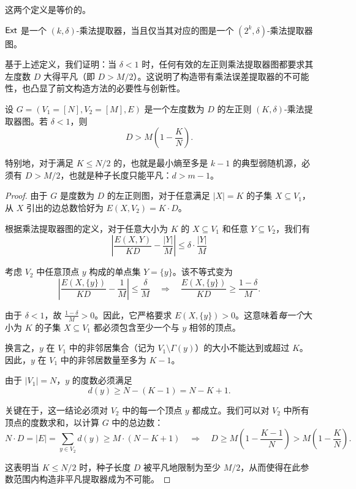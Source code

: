 这两个定义是等价的。

\begin{proposition}\label{prop:eql_ext_graph}
    $\mathsf{Ext}$ 是一个 $(k, \delta)$-乘法提取器，当且仅当其对应的图是一个 $(2^k, \delta)$-乘法提取器图。
\end{proposition}

基于上述定义，我们证明：当 $\delta < 1$ 时，任何有效的左正则乘法提取器图都要求其左度数 $D$ 大得平凡（即 $D > M / 2$）。这说明了构造带有乘法误差提取器的不可能性，也凸显了前文构造方法的必要性与创新性。

\begin{theorem}
    设 $G = (V_1 = [N], V_2 = [M], E)$ 是一个左度数为 $D$ 的左正则 $(K, \delta)$-乘法提取器图。若 $\delta < 1$，则
    $$
    D > M \left( 1 - \frac{K}{N} \right).
    $$
    
    特别地，对于满足 $K \le N/2$ 的，也就是最小熵至多是 $k - 1$ 的典型弱随机源，必须有 $D > M/2$，也就是种子长度只能平凡：$d > m - 1$。
\end{theorem}

\begin{proof}
    由于 $G$ 是度数为 $D$ 的左正则图，对于任意满足 $|X| = K$ 的子集 $X \subseteq V_1$，从 $X$ 引出的边总数恰好为 $E(X, V_2) = K \cdot D$。
    
    根据乘法提取器图的定义，对于任意大小为 $K$ 的 $X \subseteq V_1$ 和任意 $Y \subseteq V_2$，我们有
    $$
    \left| \frac{E(X,Y)}{K D} - \frac{|Y|}{M} \right| \le \delta \cdot \frac{|Y|}{M}
    $$
    
    考虑 $V_2$ 中任意顶点 $y$ 构成的单点集 $Y = \{y\}$。该不等式变为
    $$
    \left| \frac{E(X,\{y\})}{K D} - \frac{1}{M} \right| \le \frac{\delta}{M} \quad \Longrightarrow \quad \frac{E(X,\{y\})}{K D} \ge \frac{1 - \delta}{M}.
    $$
    
    由于 $\delta < 1$，故 $\frac{1 - \delta}{M} > 0$。因此，它严格要求 $E(X, \{y\}) > 0$。这意味着\emph{每一个}大小为 $K$ 的子集 $X \subseteq V_1$ 都必须包含至少一个与 $y$ 相邻的顶点。 
    
    换言之，$y$ 在 $V_1$ 中的非邻居集合（记为 $V_1 \setminus \Gamma(y)$）的大小不能达到或超过 $K$。因此，$y$ 在 $V_1$ 中的非邻居数量至多为 $K - 1$。
    
    由于 $|V_1| = N$，$y$ 的度数必须满足
    $$
    d(y) \ge N - (K - 1) = N - K + 1.
    $$
    
    关键在于，这一结论必须对 $V_2$ 中的每一个顶点 $y$ 都成立。我们可以对 $V_2$ 中所有顶点的度数求和，以计算 $G$ 中的总边数：
    $$
    N \cdot D = |E| = \sum_{y \in V_2} d(y) \ge M \cdot (N - K + 1) \quad \Longrightarrow \quad D \ge M \left( 1 - \frac{K - 1}{N} \right) > M \left( 1 - \frac{K}{N} \right).
    $$
    
    这表明当 $K \le N / 2$ 时，种子长度 $D$ 被平凡地限制为至少 $M / 2$，从而使得在此参数范围内构造非平凡提取器成为不可能。
\end{proof}

